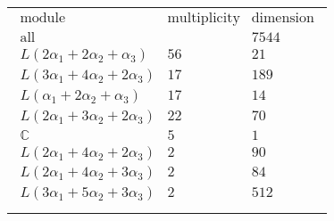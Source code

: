 \documentclass[crop,border=2mm]{standalone}
\begin{document}
\begin{tabular}{l}
$\displaystyle
\begin{array}{rll}
	\text{module}&\text{multiplicity}&\text{dimension} \\ \hline \text{all}&&7544 \\
	L\left( 2\alpha_{1}+ 2\alpha_{2}+\alpha_{3}\right)&56&21\\
	L\left( 3\alpha_{1}+ 4\alpha_{2}+ 2\alpha_{3}\right)&17&189\\
	L\left(\alpha_{1}+ 2\alpha_{2}+\alpha_{3}\right)&17&14\\
	L\left( 2\alpha_{1}+ 3\alpha_{2}+ 2\alpha_{3}\right)&22&70\\
	\mathbb{C}&5&1\\
	L\left( 2\alpha_{1}+ 4\alpha_{2}+ 2\alpha_{3}\right)&2&90\\
	L\left( 2\alpha_{1}+ 4\alpha_{2}+ 3\alpha_{3}\right)&2&84\\
	L\left( 3\alpha_{1}+ 5\alpha_{2}+ 3\alpha_{3}\right)&2&512
\end{array}
$ \\ \\

\end{tabular}
\end{document}
